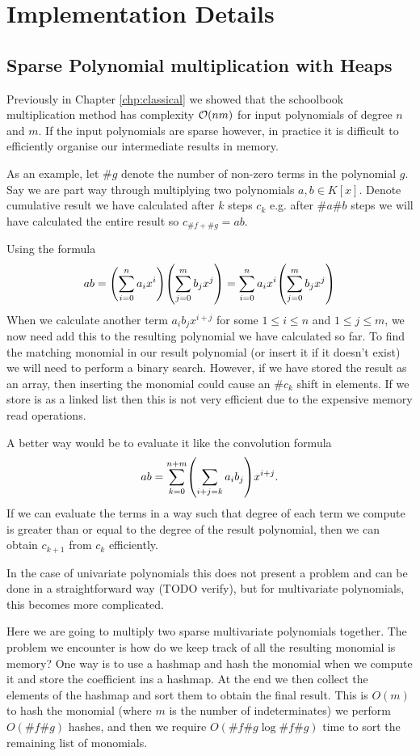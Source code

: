 \chapter{Implementation Details}\label{chp:implementation}

\section{Sparse Polynomial multiplication with Heaps}

Previously in Chapter \ref{chp:classical} we showed that the schoolbook multiplication method has complexity $\mathcal O(nm)$ for input polynomials of degree $n$ and $m$. If the input polynomials are sparse however, in practice it is difficult to efficiently organise our intermediate results in memory.

As an example, let $\# g$ denote the number of non-zero terms in the polynomial $g$. Say we are part way through multiplying two polynomials $a, b \in K[x]$. Denote cumulative result we have calculated after $k$ steps $c_k$ e.g. after $\# a \# b$ steps we will have calculated the entire result so $c_{\#f + \#g} = ab$.

Using the formula
\[
    ab = \bb{\sum^n_{i=0} a_i x^i}\bb{\sum^m_{j=0} b_j x^j} = \sum^n_{i=0} a_ix^i\bb{\sum^m_{j=0} b_j x^j}
\]
When we calculate another term $a_ib_j x^{i + j}$ for some $1 \le i \le n$ and $1 \le j \le m$, we now need add this to the resulting polynomial we have calculated so far. To find the matching monomial in our result polynomial (or insert it if it doesn't exist) we will need to perform a binary search. However, if we have stored the result as an array, then inserting the monomial could cause an $\#c_k$ shift in elements. If we store is as a linked list then this is not very efficient due to the expensive memory read operations.

A better way would be to evaluate it like the convolution formula
\[
    ab = \sum^{n + m}_{k=0} \bb{\sum_{i + j = k}a_ib_j} x^{i + j}.
\]
If we can evaluate the terms in a way such that degree of each term we compute is greater than or equal to the degree of the result polynomial, then we can obtain $c_{k+1}$ from $c_k$ efficiently.

In the case of univariate polynomials this does not present a problem and can be done in a straightforward way (TODO verify), but for multivariate polynomials, this becomes more complicated.

Here we are going to multiply two sparse multivariate polynomials together. The problem we encounter is how do we keep track of all the resulting monomial is memory? One way is to use a hashmap and hash the monomial when we compute it and store the coefficient ins a hashmap. At the end we then collect the elements of the hashmap and sort them to obtain the final result. This is $O(m)$ to hash the monomial (where $m$ is the number of indeterminates) we perform $O(\# f \# g)$ hashes, and then we require $O(\#f \#g \log \# f \# g)$ time to sort the remaining list of monomials.

